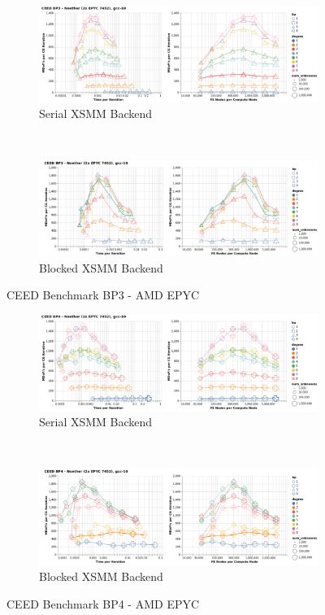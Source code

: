 \begin{figure}[ht!]
\begin{subfigure}{.99\textwidth}
\includegraphics[width=.99\linewidth]{../img/xsmmSerialBP3Clip}
\caption{Serial XSMM Backend}
\end{subfigure}\\
\begin{subfigure}{.99\textwidth}
\includegraphics[width=.99\linewidth]{../img/xsmmBlockedBP3Clip}
\caption{Blocked XSMM Backend}
\end{subfigure}
\caption{CEED Benchmark BP3 - AMD EPYC}
\label{fig:cpu-bp3}
\end{figure}

\begin{figure}[ht!]
\begin{subfigure}{.95\textwidth}
\includegraphics[width=.99\linewidth]{../img/xsmmSerialBP4Clip}
\caption{Serial XSMM Backend}
\end{subfigure}\\
\begin{subfigure}{.95\textwidth}
\includegraphics[width=.99\linewidth]{../img/xsmmBlockedBP4Clip}
\caption{Blocked XSMM Backend}
\end{subfigure}
\caption{CEED Benchmark BP4 - AMD EPYC}
\label{fig:cpu-bp4}
\end{figure}

